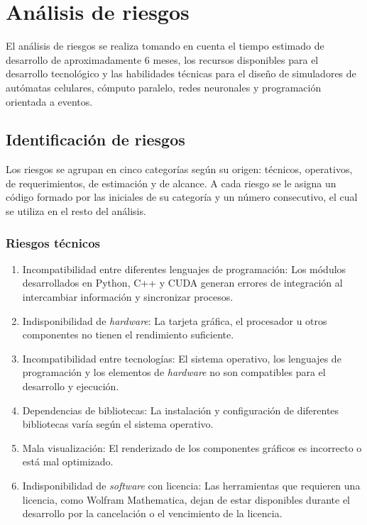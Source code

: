 \section{Análisis de riesgos}

El análisis de riesgos se realiza tomando en cuenta el tiempo estimado de desarrollo de aproximadamente 6 meses, los recursos disponibles para el desarrollo tecnológico y las habilidades técnicas para el diseño de simuladores de autómatas celulares, cómputo paralelo, redes neuronales y programación orientada a eventos. 

\subsection{Identificación de riesgos}

Los riesgos se agrupan en cinco categorías según su origen: técnicos, operativos, de requerimientos, de estimación y de alcance. A cada riesgo se le asigna un código formado por las iniciales de su categoría y un número consecutivo, el cual se utiliza en el resto del análisis.

\subsubsection{Riesgos técnicos}

\begin{enumerate}[label*=RT\arabic*]
	\item Incompatibilidad entre diferentes lenguajes de programación: Los módulos desarrollados en Python, C++ y CUDA generan errores de integración al intercambiar información y sincronizar procesos.
	
	\item Indisponibilidad de \textit{hardware}: La tarjeta gráfica, el procesador u otros componentes no tienen el rendimiento suficiente.
	
	\item Incompatibilidad entre tecnologías: El sistema operativo, los lenguajes de programación y los elementos de \textit{hardware} no son compatibles para el desarrollo y ejecución.
	
	\item Dependencias de bibliotecas: La instalación y configuración de diferentes bibliotecas varía según el sistema operativo.
	
	\item Mala visualización: El renderizado de los componentes gráficos es incorrecto o está mal optimizado.
	
	\item Indisponibilidad de \textit{software} con licencia: Las herramientas que requieren una licencia, como Wolfram Mathematica, dejan de estar disponibles durante el desarrollo por la cancelación o el vencimiento de la licencia.
\end{enumerate}

